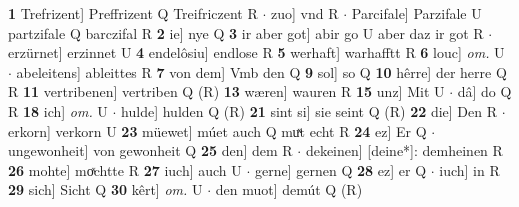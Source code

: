 \documentclass[8pt,a4paper,notitlepage]{article}
\begin{document}
\begin{table}[ht]
\begin{minipage}[t]{0.5\linewidth}
\textbf{1} Trefrizent] Preffrizent Q Treifriczent R  $\cdot$ zuo] vnd R  $\cdot$ Parcifale] Parzifale U partzifale Q barczifal R \textbf{2} ie] nye Q \textbf{3} ir aber got] abir go U aber daz ir got R  $\cdot$ erzürnet] erzinnet U \textbf{4} endelôsiu] endlose R \textbf{5} werhaft] warhafftt R \textbf{6} louc] \textit{om.} U  $\cdot$ abeleitens] ableittes R \textbf{7} von dem] Vmb den Q \textbf{9} sol] so Q \textbf{10} hêrre] der herre Q R \textbf{11} vertribenen] vertriben Q (R) \textbf{13} wæren] wauren R \textbf{15} unz] Mit U  $\cdot$ dâ] do Q R \textbf{18} ich] \textit{om.} U  $\cdot$ hulde] hulden Q (R) \textbf{21} sint si] sie seint Q (R) \textbf{22} die] Den R  $\cdot$ erkorn] verkorn U \textbf{23} müewet] múet auch Q muͯt echt R \textbf{24} ez] Er Q  $\cdot$ ungewonheit] von gewonheit Q \textbf{25} den] dem R  $\cdot$ dekeinen] [deine*]: demheinen R \textbf{26} mohte] moͯchtte R \textbf{27} iuch] auch U  $\cdot$ gerne] gernen Q \textbf{28} ez] er Q  $\cdot$ iuch] in R \textbf{29} sich] Sicht Q \textbf{30} kêrt] \textit{om.} U  $\cdot$ den muot] demút Q (R) \newline
\end{minipage}
\end{table}
\end{document}
